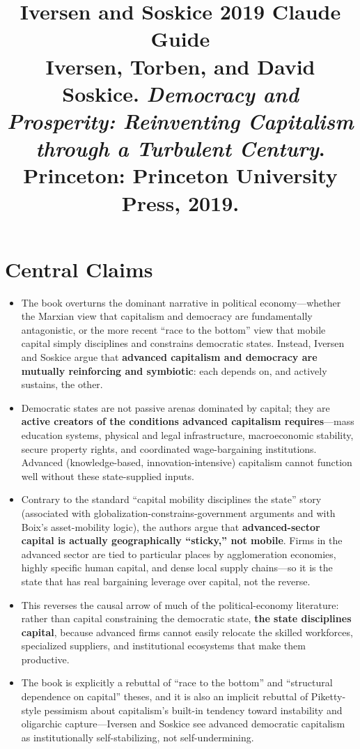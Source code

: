 \documentclass[12pt]{article}
\title{\textbf{Iversen and Soskice 2019 Claude Guide}\\
\large Iversen, Torben, and David Soskice. \textit{Democracy and Prosperity: Reinventing Capitalism through a Turbulent Century}.\\
Princeton: Princeton University Press, 2019.}
\author{}
\date{}
\begin{document}
\maketitle
\tableofcontents
\newpage

\section{Central Claims}

\begin{itemize}[leftmargin=*, itemsep=4pt]
    \item The book overturns the dominant narrative in political economy---whether the Marxian view that capitalism and democracy are fundamentally antagonistic, or the more recent ``race to the bottom'' view that mobile capital simply disciplines and constrains democratic states. Instead, Iversen and Soskice argue that \textbf{advanced capitalism and democracy are mutually reinforcing and symbiotic}: each depends on, and actively sustains, the other.
    \item Democratic states are not passive arenas dominated by capital; they are \textbf{active creators of the conditions advanced capitalism requires}---mass education systems, physical and legal infrastructure, macroeconomic stability, secure property rights, and coordinated wage-bargaining institutions. Advanced (knowledge-based, innovation-intensive) capitalism cannot function well without these state-supplied inputs.
    \item Contrary to the standard ``capital mobility disciplines the state'' story (associated with globalization-constrains-government arguments and with Boix's asset-mobility logic), the authors argue that \textbf{advanced-sector capital is actually geographically ``sticky,'' not mobile}. Firms in the advanced sector are tied to particular places by agglomeration economies, highly specific human capital, and dense local supply chains---so it is the state that has real bargaining leverage over capital, not the reverse.
    \item This reverses the causal arrow of much of the political-economy literature: rather than capital constraining the democratic state, \textbf{the state disciplines capital}, because advanced firms cannot easily relocate the skilled workforces, specialized suppliers, and institutional ecosystems that make them productive.
    \item The book is explicitly a rebuttal of ``race to the bottom'' and ``structural dependence on capital'' theses, and it is also an implicit rebuttal of Piketty-style pessimism about capitalism's built-in tendency toward instability and oligarchic capture---Iversen and Soskice see advanced democratic capitalism as institutionally self-stabilizing, not self-undermining.

\end{itemize}
\end{document}
